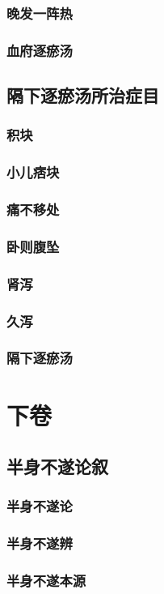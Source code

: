 \documentclass[a4paper,12pt,UTF8,twoside]{ctexbook}
\begin{document}
	\section{晚发一阵热}
	\section{血府逐瘀汤}
	\chapter{隔下逐瘀汤所治症目}
	\section{积块}
	\section{小儿痞块}
	\section{痛不移处}
	\section{卧则腹坠}
	\section{肾泻}
	\section{久泻}
	\section{隔下逐瘀汤}
	\part{下卷}
	\chapter{半身不遂论叙}
	\section{半身不遂论}
	\section{半身不遂辨}
	\section{半身不遂本源}
\end{document}

